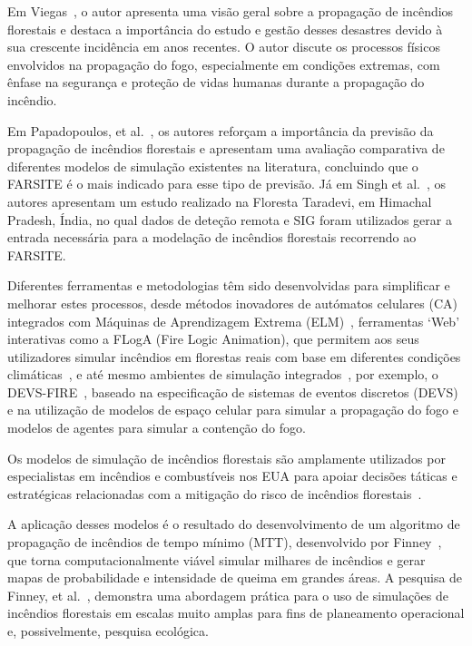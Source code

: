 Em Viegas~\cite{Viegas2011OverviewResearch}, o autor apresenta uma visão geral sobre a propagação de incêndios florestais e destaca a importância do estudo e gestão desses desastres devido à sua crescente incidência em anos recentes.
O autor discute os processos físicos envolvidos na propagação do fogo, especialmente em condições extremas, com ênfase na segurança e proteção de vidas humanas durante a propagação do incêndio.

Em Papadopoulos, et al.~\cite{Papadopoulos2011ASimulators}, os autores reforçam a importância da previsão da propagação de incêndios florestais e apresentam uma avaliação comparativa de diferentes modelos de simulação existentes na literatura, concluindo que o FARSITE é o mais indicado para esse tipo de previsão.
Já em Singh et al.~\cite{Singh2017ForestGIS}, os autores apresentam um estudo realizado na Floresta Taradevi, em Himachal Pradesh, Índia, no qual dados de deteção remota e SIG foram utilizados gerar a entrada necessária para a modelação de incêndios florestais recorrendo ao FARSITE\@.

Diferentes ferramentas e metodologias têm sido desenvolvidas para simplificar e melhorar estes processos, desde métodos inovadores de autómatos celulares (CA) integrados com Máquinas de Aprendizagem Extrema (ELM)~\cite{Zheng2017ForestMachine}, ferramentas ‘Web’ interativas como a FLogA (Fire Logic Animation), que permitem aos seus utilizadores simular incêndios em florestas reais com base em diferentes condições climáticas~\cite{Bogdos2013ACapabilities}, e até mesmo ambientes de simulação integrados~\cite{Finney2011ASimulation}, por exemplo, o DEVS-FIRE~\cite{Ntaimo2008DEVS-FIRE:Containment}, baseado na especificação de sistemas de eventos discretos (DEVS) e na utilização de modelos de espaço celular para simular a propagação do fogo e modelos de agentes para simular a contenção do fogo.

Os modelos de simulação de incêndios florestais são amplamente utilizados por especialistas em incêndios e combustíveis nos EUA para apoiar decisões táticas e estratégicas relacionadas com a mitigação do risco de incêndios florestais~\cite{Ager2009ApplicationAnalysis}.

A aplicação desses modelos é o resultado do desenvolvimento de um algoritmo de propagação de incêndios de tempo mínimo (MTT), desenvolvido por Finney~\cite{Ager2009ApplicationAnalysis}, que torna computacionalmente viável simular milhares de incêndios e gerar mapas de probabilidade e intensidade de queima em grandes áreas.
A pesquisa de Finney, et al.~\cite{Ager2009ApplicationAnalysis, Finney2011AStates}, demonstra uma abordagem prática para o uso de simulações de incêndios florestais em escalas muito amplas para fins de planeamento operacional e, possivelmente, pesquisa ecológica.